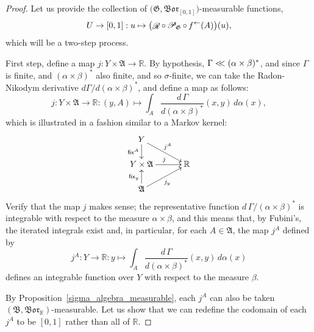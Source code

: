 \documentclass[
twoside=true,
paper=letter,
fontsize=9pt,
pagesize=auto,
leqno,
openany,
headsepline,
overfullrule,
]{scrbook}
\theoremstyle{plain}
\theoremstyle{plain}
\theoremstyle{definition}
\theoremstyle{bfnoteitalic}
\theoremstyle{bfnoteroman}
\newcommand{\sigalg}[1]{\mathfrak{#1}}
\newcommand{\cali}[1]{\mathscr{#1}}
\newcommand{\sfop}[1]{\mathsf{#1}}
\newcommand{\condprobop}[1]{\mathop{\cali{P}\hspace{-1pt}}\nolimits_{#1}}
\newcommand{\borel}{\mathfrak{Bor}}
\newcommand{\textsigma}{\hbox{\large{$\sigma$}}\kern-1pt}
\newcommand{\preimage}[1]{\mathop{#1^{\leftarrow}}}
\newcommand{\R}{\mathbb{R}}
\newcommand{\sigmaalgebra}{\sigalg{A}}
\newcommand{\sigmaalgebraii}{\sigalg{B}}
\newcommand{\funcj}{j}
\newcommand{\function}{f}
\newcommand{\measurespaceii}{Y}
\newcommand{\mspaceelt}{x}
\newcommand{\mspaceeltii}{y}
\newcommand{\abscont}{\mathrel{< \kern-3.5pt <}}
\newcommand{\seti}{A}
\newcommand{\regular}{\mathop{\cali{R}}}
\newcommand{\fixinthefirst}[1]{\sfop{fix}_{#1}}
\newcommand{\fixinthesecond}[1]{\sfop{fix}^{#1}}
\newcommand{\uspace}{U}%
\newcommand{\uspaceelt}{u}
\newcommand{\measonprod}{\Gamma}%
\newcommand{\marginalone}{\alpha}%
\newcommand{\marginaltwo}{\beta}%
\begin{document}
\begin{proof}
Let us provide the collection of
$\bigl(\sigalg{G}, \borel_{[0,1]}\bigr)$\hyp{}measurable functions,
\[
\uspace\to [0,1] : \uspaceelt\mapsto
\bigl( \regular\circ\condprobop{\sigalg{G}}\circ\preimage{\function}
(\seti)\bigr)(\uspaceelt),
\]
which will be a two-step process.

First step, define a map
$\funcj:\measurespaceii\times\sigmaalgebra\to \R$. By hypothesis,
$\measonprod \abscont (\marginalone\times\marginaltwo)^*$, and since
$\measonprod$ is finite, and $(\marginalone\times\marginaltwo)^*$ also finite, and so \textsigma\hyp{}finite, we can take the Radon-Nikodym derivative
$d\measonprod / d(\marginalone\times\marginaltwo)^*$, and define a map as follows:
\[
\funcj
:\measurespaceii\times\sigmaalgebra\to \R
:(\mspaceeltii,\seti)\mapsto
\int_\seti
\dfrac{d\,\measonprod}{d(\marginalone\times\marginaltwo)^*}
(\mspaceelt,\mspaceeltii)\, d\marginalone(\mspaceelt),
\]
which is illustrated in a fashion similar to a Markov kernel:
\[
\xymatrix@R=16pt@C=30pt{
\measurespaceii
\ar[d]_-{\fixinthesecond{\seti}}
\ar[dr]^{\funcj^\seti} &
\\
\measurespaceii\times\sigmaalgebra \ar[r]^{\funcj} & \R
\\
\sigmaalgebra
\ar[ur]_{\funcj_\mspaceeltii}
\ar[u]^{\fixinthefirst{\mspaceeltii}} &
\\
}
\]
Verify that the map $\funcj$ makes sense; the representative function
$d\,\measonprod/(\marginalone\times\marginaltwo)^*$
is integrable with respect to the measure
$\marginalone\times\marginaltwo$, and this means that, by Fubini's, the iterated integrals exist and, in particular, for each
$\seti\in\sigmaalgebra$,
the map $\funcj^\seti$ defined by
\[
\funcj^\seti:
\measurespaceii\to \R
:\mspaceeltii\mapsto
\int_\seti
\dfrac{d\,\measonprod}{d(\marginalone\times\marginaltwo)^*}
(\mspaceelt,\mspaceeltii)\, d\marginalone(\mspaceelt)
\]
defines an integrable function over
$\measurespaceii$ with respect to the measure $\marginaltwo$.

By Proposition~\ref{sigma_algebra_measurable}, each $\funcj^\seti$ can also be taken
$(\sigmaalgebraii,\borel_\R)$\hyp{}measurable.
Let us show that we can redefine the codomain of each
$\funcj^\seti$ to be $[0,1]$ rather than all of $\R$.


\end{proof}
\end{document}
